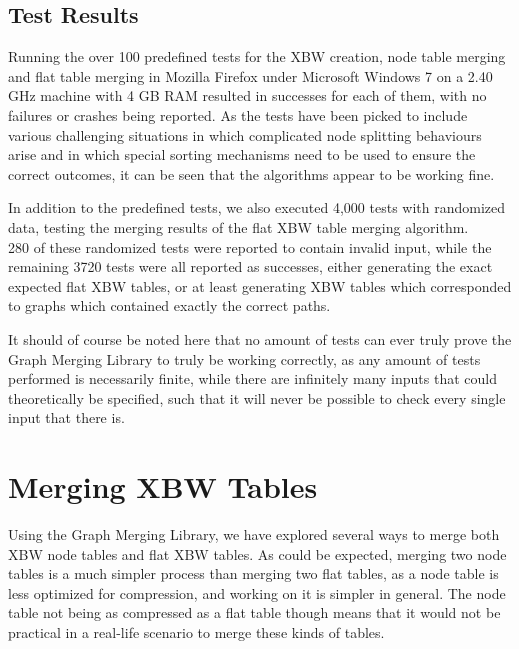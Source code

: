 \documentclass[a4paper,12pt,twoside,BCOR=10mm]{scrbook}
\begin{document}
\subsection{Test Results}

Running the over 100 predefined tests for the XBW creation, node table merging 
and flat table merging in Mozilla Firefox under Microsoft Windows 7 on a 2.40 GHz machine with 4 GB RAM 
resulted in successes for each of them, 
with no failures or crashes being reported. 
As the tests have been picked to include various challenging situations 
in which complicated node splitting behaviours arise and in which 
special sorting mechanisms need to be used to ensure the correct outcomes, 
it can be seen that the algorithms appear to be working fine.

In addition to the predefined tests, we also executed 4,000 tests with randomized data, 
testing the merging results of the flat XBW table merging algorithm. \\
280 of these randomized tests were reported to contain invalid input, 
while the remaining 3720 tests were all reported as successes, 
either generating the exact expected flat XBW tables, or at least 
generating XBW tables which corresponded to graphs which contained exactly the 
correct paths.


It should of course be noted here that no amount of tests can ever 
truly prove the Graph Merging Library to truly be working correctly, 
as any amount of tests performed is necessarily finite, while there are 
infinitely many inputs that could theoretically be specified, 
such that it will never be possible to check every single input that there is.

\section{Merging XBW Tables}
%

Using the Graph Merging Library, we have explored several ways to merge both XBW node tables and flat XBW tables. 
As could be expected, merging two node tables is a much simpler process than merging two flat tables, 
as a node table is less optimized for compression, and working on it is simpler in general. 
The node table not being as compressed as a flat table though means 
that it would not be practical in a real-life scenario to merge these kinds of tables.
\end{document}
